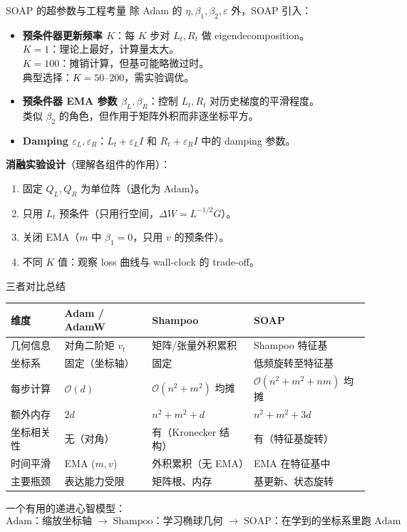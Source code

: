 \documentclass[aspectratio=169,10pt]{ctexbeamer}
\newcommand{\eps}{\varepsilon}
\begin{document}
\begin{frame}{SOAP 的超参数与工程考量}
除 Adam 的 $\eta,\beta_1,\beta_2,\eps$ 外，SOAP 引入：
\begin{itemize}
  \item \textbf{预条件器更新频率 $K$}：每 $K$ 步对 $L_t,R_t$ 做 eigendecomposition。\\
  $K=1$：理论上最好，计算量太大。\\
  $K=100$：摊销计算，但基可能略微过时。\\
  典型选择：$K=50$--$200$，需实验调优。
  \item \textbf{预条件器 EMA 参数 $\beta_L,\beta_R$}：控制 $L_t,R_t$ 对历史梯度的平滑程度。\\
  类似 $\beta_2$ 的角色，但作用于矩阵外积而非逐坐标平方。
  \item \textbf{Damping $\eps_L,\eps_R$}：$L_t+\eps_L I$ 和 $R_t+\eps_R I$ 中的 damping 参数。
\end{itemize}

\vspace{.25cm}
\textbf{消融实验设计}（理解各组件的作用）：
\begin{enumerate}
  \item 固定 $Q_L,Q_R$ 为单位阵（退化为 Adam）。
  \item 只用 $L_t$ 预条件（只用行空间，$\Delta W=L^{-1/2}G$）。
  \item 关闭 EMA（$m$ 中 $\beta_1=0$，只用 $v$ 的预条件）。
  \item 不同 $K$ 值：观察 loss 曲线与 wall-clock 的 trade-off。
\end{enumerate}
\end{frame}

\begin{frame}{三者对比总结}
\begin{tabular}{p{2.5cm}p{3cm}p{3.2cm}p{3cm}}
\toprule
维度 & Adam / AdamW & Shampoo & SOAP \\
\midrule
几何信息 & 对角二阶矩 $v_t$ & 矩阵/张量外积累积 & Shampoo 特征基 \\
坐标系 & 固定（坐标轴） & 固定 & 低频旋转至特征基 \\
每步计算 & $\mathcal{O}(d)$ & $\mathcal{O}(n^2+m^2)$ 均摊 & $\mathcal{O}(n^2+m^2+nm)$ 均摊 \\
额外内存 & $2d$ & $n^2+m^2+d$ & $n^2+m^2+3d$ \\
坐标相关性 & 无（对角） & 有（Kronecker 结构） & 有（特征基旋转） \\
时间平滑 & EMA ($m,v$) & 外积累积（无 EMA） & EMA 在特征基中 \\
主要瓶颈 & 表达能力受限 & 矩阵根、内存 & 基更新、状态旋转 \\
\bottomrule
\end{tabular}

\vspace{.4cm}
一个有用的递进心智模型：
\[
  \text{Adam：缩放坐标轴}\;\longrightarrow\;
  \text{Shampoo：学习椭球几何}\;\longrightarrow\;
  \text{SOAP：在学到的坐标系里跑 Adam}
\]
\end{frame}
\end{document}
